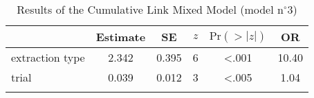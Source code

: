 \begin{table}
\begin{tabular}{l S[table-format=1.3] S[table-format=1.3] c S[table-format=<1.3] S[table-format=2.2]}
  \lsptoprule
 & {Estimate} & {SE} & {$z$} & {$\text{Pr}(>|z|)$} & {OR}\\ 
  \midrule
  extraction type & 2.342 & 0.395 & 6 & <.001 & 10.40 \\ 
  trial           & 0.039 & 0.012 & 3 & <.005 & 1.04 \\ 
   \lspbottomrule
\end{tabular}
\caption{Results of the Cumulative Link Mixed Model (model n$^{\circ}$3)}
\label{tab:exp10-m3}
\end{table}
